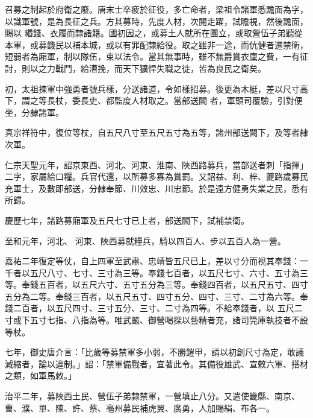 
\begin{pinyinscope}

 召募之制起於府衛之廢。唐末士卒疲於征役，多亡命者，梁祖令諸軍悉黵面為字，以識軍號，是為長征之兵。方其募時，先度人材，次閱走躍，試瞻視，然後黵面，賜以
 緡錢、衣履而隸諸籍。國初因之，或募土人就所在團立，或取營伍子弟聽從本軍，或募饑民以補本城，或以有罪配隸給役。取之雖非一途，而伉健者遷禁衛，短弱者為廂軍，制以隊伍，束以法令。當其無事時，雖不無爵賞衣廩之費，一有征討，則以之力戰鬥，給漕挽，而天下獷悍失職之徒，皆為良民之衛矣。



 初，太祖揀軍中強勇者號兵樣，分送諸道，令如樣招募。後更為木梃，差以尺寸高下，謂之等長杖，委長吏、都監度人材取之。當部送闕
 者，軍頭司覆驗，引對便坐，分隸諸軍。



 真宗祥符中，復位等杖，自五尺八寸至五尺五寸為五等，諸州部送闕下，及等者隸次軍。



 仁宗天聖元年，詔京東西、河北、河東、淮南、陜西路募兵，當部送者刺「指揮」二字，家屬給口糧。兵官代還，以所募多寡為賞罰。又詔益、利、梓、夔路歲募民充軍士，及數即部送，分隸奉節、川效忠、川忠節。於是遠方健勇失業之民，悉有所歸。



 慶歷七年，諸路募廂軍及五尺七寸已上者，部送闕下，試補禁衛。



 至和元年，河北、
 河東、陜西募就糧兵，騎以四百人、步以五百人為一營。



 嘉祐二年復定等仗，自上四軍至武肅、忠靖皆五尺已上，差以寸分而視其奉錢：一千者以五尺八寸、七寸、三寸為三等。奉錢七百者，以五尺七寸、六寸、五寸為三等。奉錢五百者，以五尺六寸、五寸五分為三等。奉錢四百者，以五尺五寸、四寸五分為二等。奉錢三百者，以五尺五寸、四寸五分、四寸、三寸、二寸為六等。奉錢二百者，以五尺四寸、三寸五分、三寸、二寸為四等。不給奉錢者，以
 五尺二寸或下五寸七指、八指為等。唯武嚴、御營喝探以藝精者充，諸司筦庫執技者不設等杖。



 七年，御史唐介言：「比歲等募禁軍多小弱，不勝鎧甲，請以初創尺寸為定，敢議減縮者，論以違制。」詔：「禁軍備戰者，宜著此令。其備役雄武、宣敕六軍、搭材之類，如軍馬敕。」



 治平二年，募陜西土民、營伍子弟隸禁軍，一營填止八分。又遣使畿縣、南京、曹、濮、單、陳、許、蔡、亳州募民補虎翼、廣勇，人加賜絹、布各一。




\end{pinyinscope}
